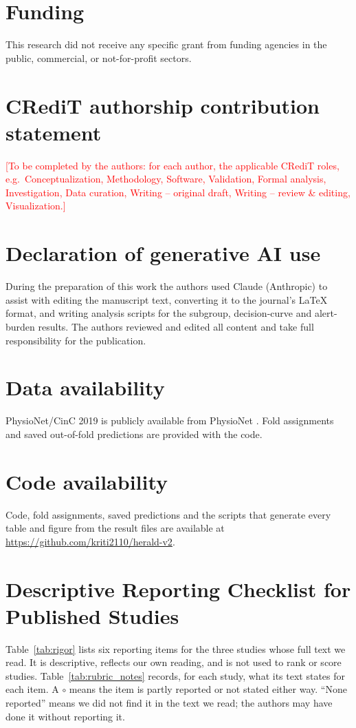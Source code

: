 \documentclass[preprint,12pt]{elsarticle}
\begin{document}
\section*{Funding}
This research did not receive any specific grant from funding agencies in the public, commercial, or not-for-profit sectors.

\section*{CRediT authorship contribution statement}
\textcolor{red}{[To be completed by the authors: for each author, the applicable CRediT roles, e.g.\ Conceptualization, Methodology, Software, Validation, Formal analysis, Investigation, Data curation, Writing -- original draft, Writing -- review \& editing, Visualization.]}

\section*{Declaration of generative AI use}
During the preparation of this work the authors used Claude (Anthropic) to assist with editing the manuscript text, converting it to the journal's LaTeX format, and writing analysis scripts for the subgroup, decision-curve and alert-burden results. The authors reviewed and edited all content and take full responsibility for the publication.

\section*{Data availability}
PhysioNet/CinC 2019 is publicly available from PhysioNet \cite{reyna2020,goldberger2000}. Fold assignments and saved out-of-fold predictions are provided with the code.

\section*{Code availability}
Code, fold assignments, saved predictions and the scripts that generate every table and figure from the result files are available at \url{https://github.com/kriti2110/herald-v2}.

\appendix
\section{Descriptive Reporting Checklist for Published Studies}
\label{app:checklist}
Table~\ref{tab:rigor} lists six reporting items for the three studies whose full text we read. It is descriptive, reflects our own reading, and is not used to rank or score studies. Table~\ref{tab:rubric_notes} records, for each study, what its text states for each item. A $\circ$ means the item is partly reported or not stated either way. ``None reported'' means we did not find it in the text we read; the authors may have done it without reporting it.
\end{document}
